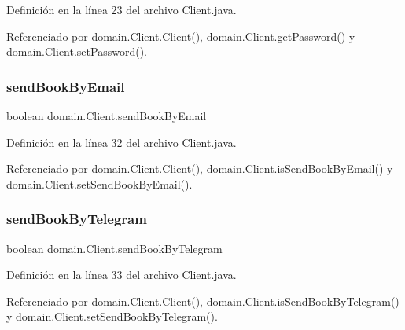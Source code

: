 Definición en la línea 23 del archivo Client.\+java.



Referenciado por domain.\+Client.\+Client(), domain.\+Client.\+get\+Password() y domain.\+Client.\+set\+Password().

\mbox{\label{classdomain_1_1_client_a7466013d1a12e9d4f7fc739c68bdd238}} 
\subsubsection{\texorpdfstring{sendBookByEmail}{sendBookByEmail}}
{\footnotesize\ttfamily boolean domain.\+Client.\+send\+Book\+By\+Email\hspace{0.3cm}{\ttfamily [private]}}



Definición en la línea 32 del archivo Client.\+java.



Referenciado por domain.\+Client.\+Client(), domain.\+Client.\+is\+Send\+Book\+By\+Email() y domain.\+Client.\+set\+Send\+Book\+By\+Email().

\mbox{\label{classdomain_1_1_client_a303c59a2c1c521a67583268436f3b951}} 
\subsubsection{\texorpdfstring{sendBookByTelegram}{sendBookByTelegram}}
{\footnotesize\ttfamily boolean domain.\+Client.\+send\+Book\+By\+Telegram\hspace{0.3cm}{\ttfamily [private]}}



Definición en la línea 33 del archivo Client.\+java.



Referenciado por domain.\+Client.\+Client(), domain.\+Client.\+is\+Send\+Book\+By\+Telegram() y domain.\+Client.\+set\+Send\+Book\+By\+Telegram().

\mbox{\label{classdomain_1_1_client_a48de873a69fd65be53e47b2cbb2c309d}} 
